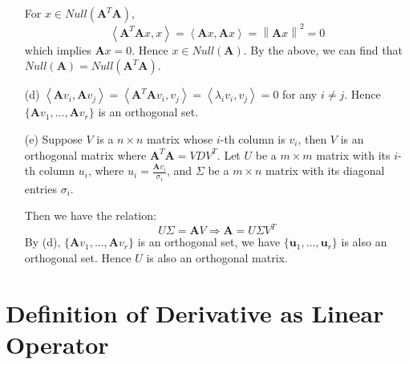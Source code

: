 \documentclass[12pt,a4paper]{article}
\begin{document}
\begin{enumerate}
        For $x\in Null(\mathbf{A}^{T}\mathbf{A})$, 
        \[
            \left\langle \mathbf{A}^{T}\mathbf{A}x, x \right\rangle =  \left\langle \mathbf{A}x, \mathbf{A}x\right\rangle =\left\lVert \mathbf{A}x \right\rVert^{2} = 0
        \]
        which implies $\mathbf{A}x = 0$. Hence $x\in Null(\mathbf{A})$.
        By the above, we can find that $Null(\mathbf{A}) = Null(\mathbf{A}^{T}\mathbf{A})$.
    \item[(d)]
        $\left\langle \mathbf{A}v_{i}, \mathbf{A}v_{j} \right\rangle = \left\langle \mathbf{A}^{T}\mathbf{A} v_{i}, v_{j} \right\rangle = \left\langle \lambda_{i}v_{i}, v_{j} \right\rangle = 0$ for any $i \neq j$. Hence $\{\mathbf{A}v_{1}, ..., \mathbf{A}v_{r}\}$ is an orthogonal set.
    \item[(e)]
        Suppose $V$ is a $n \times n$ matrix whose $i$-th column is $v_{i}$, then $V$ is an orthogonal matrix where $\mathbf{A}^{T}\mathbf{A} = VDV^{T}$. Let $U$ be a $m \times m$ matrix with its $i$-th column $u_{i}$, where $u_{i} = \frac{\mathbf{A}v_{i}}{\sigma_{i}}$, and $\Sigma$ be a $m \times n$ matrix with its diagonal entries $\sigma_{i}$.

        Then we have the relation:
        \[
            U\Sigma = \mathbf{A}V \Rightarrow \mathbf{A} = U\Sigma V^{T}
        \]
        By (d), $\{\mathbf{A}v_{1}, ..., \mathbf{A}v_{r}\}$ is an orthogonal set, we have $\{\mathbf{u}_{1}, ..., \mathbf{u}_{r}\}$ is also an orthogonal set.
        Hence $U$ is also an orthogonal matrix.
\end{enumerate}

\section{Definition of Derivative as Linear Operator}    
\end{document}
